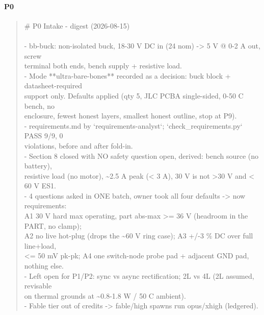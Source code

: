 \documentclass[11pt,a4paper]{article}
\begin{document}
\paragraph*{P0}
\begin{quote}\small\ttfamily\raggedright
\# P0 Intake - digest (2026-08-15)\\
~\\
- bb-buck: non-isolated buck, 18-30 V DC in (24 nom) -\textgreater{} 5 V @ 0-2 A out, screw\\
  terminal both ends, bench supply + resistive load.\\
- Mode {*}{*}ultra-bare-bones{*}{*} recorded as a decision: buck block + datasheet-required\\
  support only. Defaults applied (qty 5, JLC PCBA single-sided, 0-50 C bench, no\\
  enclosure, fewest honest layers, smallest honest outline, stop at P9).\\
- requirements.md by `requirements-analyst`; `check\_requirements.py` PASS 9/9, 0\\
  violations, before and after fold-in.\\
- Section 8 closed with NO safety question open, derived: bench source (no battery),\\
  resistive load (no motor), \textasciitilde{}2.5 A peak (\textless{} 3 A), 30 V is not \textgreater{}30 V and \textless{} 60 V ES1.\\
- 4 questions asked in ONE batch, owner took all four defaults -\textgreater{} now requirements:\\
  A1 30 V hard max operating, part abs-max \textgreater{}= 36 V (headroom in the PART, no clamp);\\
  A2 no live hot-plug (drops the \textasciitilde{}60 V ring case); A3 +/-3 \% DC over full line+load,\\
  \textless{}= 50 mV pk-pk; A4 one switch-node probe pad + adjacent GND pad, nothing else.\\
- Left open for P1/P2: sync vs async rectification; 2L vs 4L (2L assumed, revisable\\
  on thermal grounds at \textasciitilde{}0.8-1.8 W / 50 C ambient).\\
- Fable tier out of credits -\textgreater{} fable/high spawns run opus/xhigh (ledgered).
\end{quote}
\end{document}
